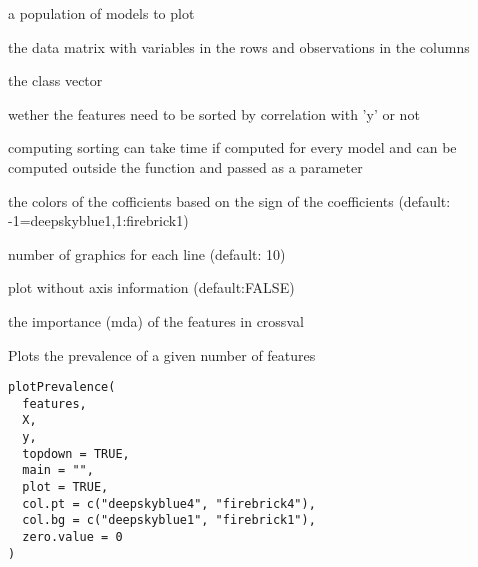 \documentclass[a4paper]{book}
\begin{document}
\begin{Arguments}
\begin{ldescription}
\item[\code{pop:}] a population of models to plot

\item[\code{X:}] the data matrix with variables in the rows and observations in the columns

\item[\code{y:}] the class vector

\item[\code{sort.features:}] wether the features need to be sorted by correlation with 'y' or not

\item[\code{sort.ind:}] computing sorting can take time if computed for every model and can be computed outside the function and passed as a parameter

\item[\code{col.sign:}] the colors of the cofficients based on the sign of the coefficients (default: -1=deepskyblue1,1:firebrick1)

\item[\code{ncol:}] number of graphics for each line (default: 10)

\item[\code{slim:}] plot without axis information (default:FALSE)

\item[\code{importance:}] the importance (mda) of the features in crossval
\end{ldescription}
\end{Arguments}
%
\begin{Description}
Plots the prevalence of a given number of features
\end{Description}
%
\begin{Usage}
\begin{verbatim}
plotPrevalence(
  features,
  X,
  y,
  topdown = TRUE,
  main = "",
  plot = TRUE,
  col.pt = c("deepskyblue4", "firebrick4"),
  col.bg = c("deepskyblue1", "firebrick1"),
  zero.value = 0
)
\end{verbatim}
\end{Usage}
%
\end{document}
